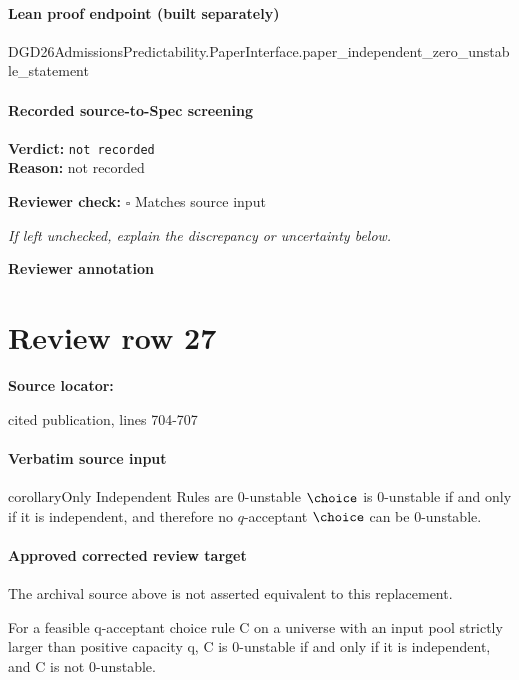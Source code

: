 \documentclass[10pt]{article}
\newcommand{\reviewerbox}{%
  \par\noindent\fbox{\parbox{0.96\linewidth}{\rule{0pt}{0.38in}}}\par
}
\newcommand{\reviewmatch}[1]{%
  \par\noindent\textbf{Reviewer check:} $\square$\; #1\par
  \noindent\emph{If left unchecked, explain the discrepancy or uncertainty below.}\par
}
\begin{document}
\paragraph{Lean proof endpoint (built separately)}\begin{ReviewVerbatim}
DGD26AdmissionsPredictability.PaperInterface.paper_independent_zero_unstable_statement
\end{ReviewVerbatim}

\paragraph{Recorded source-to-Spec screening}
\textbf{Verdict:} \texttt{not recorded}
\\
\textbf{Reason:} not recorded
\reviewmatch{Matches source input}
\noindent\textbf{Reviewer annotation}\par
\reviewerbox
\clearpage
\hypertarget{source-claim-d920f9b7847b2baa}{}
\section*{Review row 27}
\textbf{Source locator:} {\footnotesize\raggedright cited publication, lines 704-\allowbreak{}707\par}
\paragraph{Verbatim source input}
\begin{ReviewVerbatim}
\begin{restatable}{corollary}{Only Independent Rules are 0-unstable}
\label{thm:independent-zero-unstable}
$\choice$ is $0$-unstable if and only if it is independent, and therefore no $q$-acceptant $\choice$ can be $0$-unstable.
\end{restatable}
\end{ReviewVerbatim}

\paragraph{Approved corrected review target}
The archival source above is not asserted equivalent to this replacement.
\begin{ReviewVerbatim}
For a feasible q-acceptant choice rule C on a universe with an input pool strictly larger than positive capacity q, C is 0-unstable if and only if it is independent, and C is not 0-unstable.
\end{ReviewVerbatim}
\end{document}
